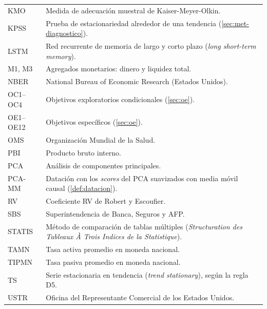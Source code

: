 {\begin{longtable}{@{}p{}p{}@{}}
KMO & Medida de adecuación muestral de Kaiser-Meyer-Olkin. \\
KPSS & Prueba de estacionariedad alrededor de una tendencia (\cref{sec:met-diagnostico}). \\
LSTM & Red recurrente de memoria de largo y corto plazo (\emph{long short-term memory}). \\
M1, M3 & Agregados monetarios: dinero y liquidez total. \\
NBER & National Bureau of Economic Research (Estados Unidos). \\
OC1--OC4 & Objetivos exploratorios condicionales (\cref{sec:oe}). \\
OE1--OE12 & Objetivos específicos (\cref{sec:oe}). \\
OMS & Organización Mundial de la Salud. \\
PBI & Producto bruto interno. \\
PCA & Análisis de componentes principales. \\
PCA-MM\ventanaMediaMovil{} & Datación con los \emph{scores} del PCA suavizados con media móvil causal (\cref{def:datacion}). \\
RV & Coeficiente RV de Robert y Escoufier. \\
SBS & Superintendencia de Banca, Seguros y AFP. \\
STATIS & Método de comparación de tablas múltiples (\emph{Structuration des Tableaux À Trois Indices de la Statistique}). \\
TAMN & Tasa activa promedio en moneda nacional. \\
TIPMN & Tasa pasiva promedio en moneda nacional. \\
TS & Serie estacionaria en tendencia (\emph{trend stationary}), según la regla D5. \\
USTR & Oficina del Representante Comercial de los Estados Unidos. \\
\end{longtable}
}
